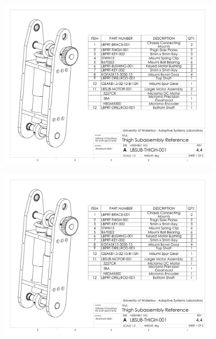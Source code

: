 \begin{figure}[!h]
	\begin{center}
    \includegraphics[scale=0.72,angle=90]{fig/drawings/lbsub-thigh-001.pdf}
	\end{center}
\end{figure}

\begin{figure}[!h]
	\begin{center}
    \includegraphics[scale=0.72,angle=90,page=2]{fig/drawings/lbsub-thigh-001.pdf}
	\end{center}
\end{figure}

